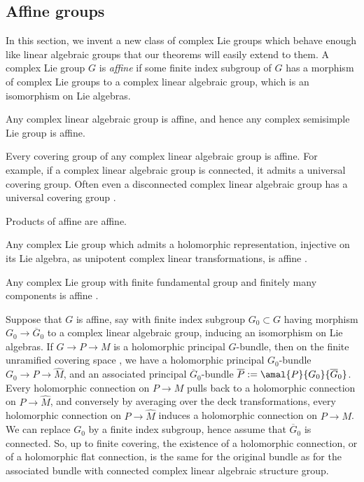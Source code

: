 \subsection{Affine groups}\label{subsection:affine.groups}
In this section, we invent a new class of complex Lie groups which behave enough like linear algebraic groups that our theorems will easily extend to them.
A complex Lie group $G$ is \emph{affine} if some finite index subgroup of $G$ has a morphism of complex Lie groups to a complex linear algebraic group, which is an isomorphism on Lie algebras.
\begin{Example}
Any complex linear algebraic group is affine, and hence any complex semisimple Lie group is affine.
\end{Example}
\begin{Example}
Every covering group of any complex linear algebraic group is affine.
For example, if a complex linear algebraic group is connected, it admits a universal covering group.
Often even a disconnected complex linear algebraic group has a universal covering group \cite[Theorem~18.2.1, Example~18.2.2]{Hilgert.Neeb:2012}.
\end{Example}
\begin{Example}
Products of affine are affine.
\end{Example}
\begin{Example}
Any complex Lie group which admits a holomorphic representation, injective on its Lie algebra, as unipotent complex
linear transformations, is affine \cite[Corollary 14.38]{Milne:2017}.
\end{Example}
\begin{Example}
Any complex Lie group with finite fundamental group and finitely many components is affine
\cite[Corollary 16.3.9]{Hilgert.Neeb:2012}.
\end{Example}

Suppose that $G$ is affine, say with finite index subgroup $G_0 \subset G$ having morphism $G_0 \longrightarrow
\overline{G}_0$ to a complex linear algebraic group, inducing an isomorphism on Lie algebras.
If $G \to P \to M$ is a holomorphic principal $G$-bundle, then on the finite unramified covering
space , we have a holomorphic principal $G_0$-bundle $G_0 \to P
\to \widehat{M}$, and an associated principal $\overline{G}_0$-bundle $\overline{P} := \amal{P}{G_0}{\overline{G}_0}$.
Every holomorphic connection on $P \to M$ pulls back to a holomorphic connection on $P
 \longrightarrow \widehat{M}$, and conversely by averaging over the deck transformations,
every holomorphic connection on $P \to \widehat{M}$ induces a holomorphic connection on $P \to M$.
We can replace $G_0$ by a finite index subgroup, hence assume that $\overline{G}_0$ is connected.
So, up to finite covering, the existence of a holomorphic connection, or of a holomorphic flat connection, is the same for the
original bundle as for the associated bundle with connected complex linear algebraic structure group.

